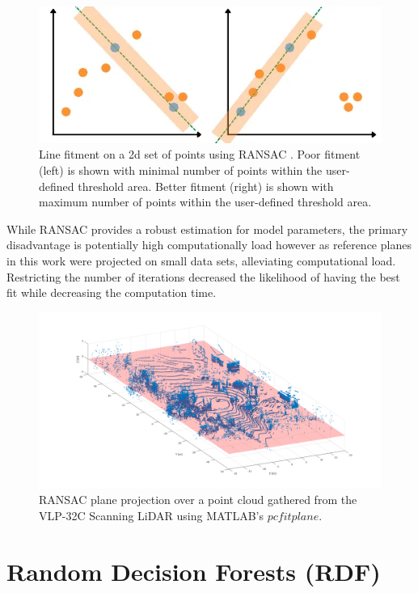 \documentclass[numbered,pdftex]{ohio-etd}
\begin{document}
{{		\begin{figure}[H]
			\centering
			\includegraphics[width=0.7\linewidth]{Defense_Images/RANSAC_good_and_bad.png}
			\caption[2D Simplified RANSAC Example]{Line fitment on a 2d set of points using RANSAC \cite{alam_using_2022}. Poor fitment (left) is shown with minimal number of points within the user-defined threshold area. Better fitment (right) is shown with maximum number of points within the user-defined threshold area.}
			\label{fig:Ransac_2D_Example}
		\end{figure}

		{While RANSAC provides a robust estimation for model parameters, the primary disadvantage is potentially high computationally load \cite{yaniv_random_2010} however as reference planes in this work were projected on small data sets, alleviating computational load. Restricting the number of iterations decreased the likelihood of having the best fit while decreasing the computation time.}
	
		
		\begin{figure}[H]
			\centering
			\includegraphics[width=0.7\linewidth]{Defense_Images/RANSAC_example_proj.png}
			\caption[RANSAC Plane Projection Example]{RANSAC plane projection over a point cloud gathered from the VLP-32C Scanning LiDAR using MATLAB's $pcfitplane$.}
			\label{fig:RANSAC_example_proj}
		\end{figure}
		
	} %
	
	\section{Random Decision Forests (RDF)}\label{RDF_SECT}{
		
}}
\end{document}
